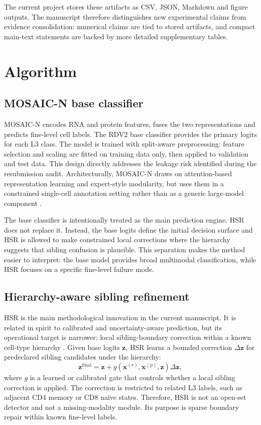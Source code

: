 \documentclass[unnumsec,webpdf,contemporary,large,numbered]{oup-authoring-template}
\begin{document}
The current project stores these artifacts as CSV, JSON, Markdown and figure outputs. The manuscript therefore distinguishes new experimental claims from evidence consolidation: numerical claims are tied to stored artifacts, and compact main-text statements are backed by more detailed supplementary tables.

\section{Algorithm}

\subsection{MOSAIC-N base classifier}

MOSAIC-N encodes RNA and protein features, fuses the two representations and predicts fine-level cell labels. The RDV2 base classifier provides the primary logits for each L3 class. The model is trained with split-aware preprocessing: feature selection and scaling are fitted on training data only, then applied to validation and test data. This design directly addresses the leakage risk identified during the resubmission audit. Architecturally, MOSAIC-N draws on attention-based representation learning and expert-style modularity, but uses them in a constrained single-cell annotation setting rather than as a generic large-model component \citep{vaswani2017,shazeer2017moe,zhou2022expert}.

The base classifier is intentionally treated as the main prediction engine. HSR does not replace it. Instead, the base logits define the initial decision surface and HSR is allowed to make constrained local corrections where the hierarchy suggests that sibling confusion is plausible. This separation makes the method easier to interpret: the base model provides broad multimodal classification, while HSR focuses on a specific fine-level failure mode.

\subsection{Hierarchy-aware sibling refinement}

HSR is the main methodological innovation in the current manuscript. It is related in spirit to calibrated and uncertainty-aware prediction, but its operational target is narrower: local sibling-boundary correction within a known cell-type hierarchy \citep{guo2017calibration,lakshminarayanan2017,gal2016,hendrycks2017,geifman2017}. Given base logits $\mathbf{z}$, HSR learns a bounded correction $\Delta\mathbf{z}$ for predeclared sibling candidates under the hierarchy:
\begin{equation}
\mathbf{z}^{\mathrm{final}} = \mathbf{z} + g(\mathbf{x}^{(r)}, \mathbf{x}^{(p)}, \mathbf{z}) \Delta\mathbf{z},
\end{equation}
where $g$ is a learned or calibrated gate that controls whether a local sibling correction is applied. The correction is restricted to related L3 labels, such as adjacent CD4 memory or CD8 naive states. Therefore, HSR is not an open-set detector and not a missing-modality module. Its purpose is sparse boundary repair within known fine-level labels.
\end{document}
